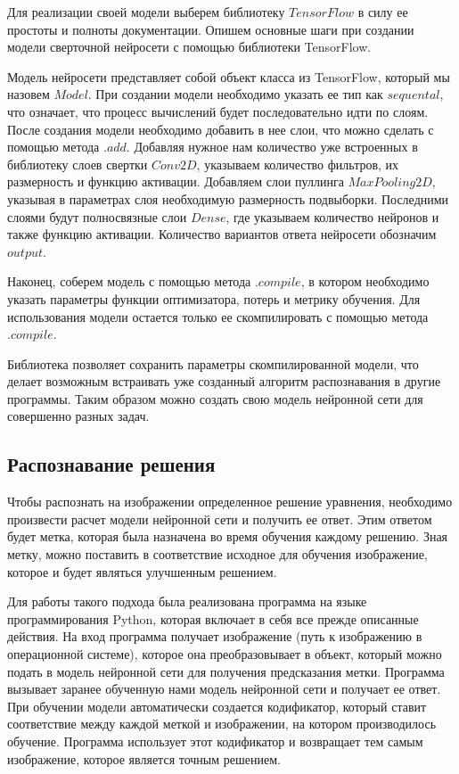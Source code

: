 \documentclass[12pt, a4paper]{article}
\begin{document}
Для реализации своей модели выберем библиотеку $TensorFlow$ в силу ее простоты и полноты документации. Опишем основные шаги при создании модели сверточной нейросети с помощью библиотеки TensorFlow. 

 Модель нейросети представляет собой объект класса из TensorFlow, который мы назовем $Model$. При создании модели необходимо указать ее тип как $sequental$, что означает, что процесс вычислений будет последовательно идти по слоям. После создания модели необходимо добавить в нее слои, что можно сделать с помощью метода $.add$. Добавляя нужное нам количество уже встроенных в библиотеку слоев свертки $Conv2D$, указываем количество фильтров, их размерность и функцию активации. Добавляем слои пуллинга $MaxPooling2D$, указывая в параметрах слоя необходимую размерность подвыборки. Последними слоями будут полносвязные слои $Dense$, где указываем количество нейронов и также функцию активации. Количество вариантов ответа нейросети обозначим $output$.
 
  Наконец, соберем модель с помощью метода $.compile$, в котором необходимо указать параметры функции оптимизатора, потерь и метрику обучения.  Для использования модели остается только ее скомпилировать с помощью метода $.compile$. 
 
 Библиотека позволяет сохранить параметры скомпилированной модели, что делает возможным встраивать уже созданный алгоритм распознавания в другие программы. Таким образом можно создать свою модель нейронной сети для совершенно разных задач.
 
  
 
 
\subsection{Распознавание решения}

Чтобы распознать на изображении определенное решение уравнения, необходимо произвести расчет модели нейронной сети и получить ее ответ. Этим ответом будет метка, которая была назначена во время обучения каждому решению. Зная метку, можно поставить в соответствие исходное для обучения изображение, которое и будет являться улучшенным решением. 

Для работы такого подхода была реализована программа на языке программирования Python, которая включает в себя все прежде описанные действия. На вход программа получает изображение (путь к изображению в операционной системе), которое она преобразовывает в объект, который можно подать в модель нейронной сети для получения предсказания метки. Программа вызывает заранее обученную нами модель нейронной сети и получает ее ответ. При обучении модели автоматически создается кодификатор, который ставит соответствие между каждой меткой и изображении, на котором производилось обучение. Программа использует этот кодификатор и возвращает тем самым изображение, которое является точным решением.
\end{document}
